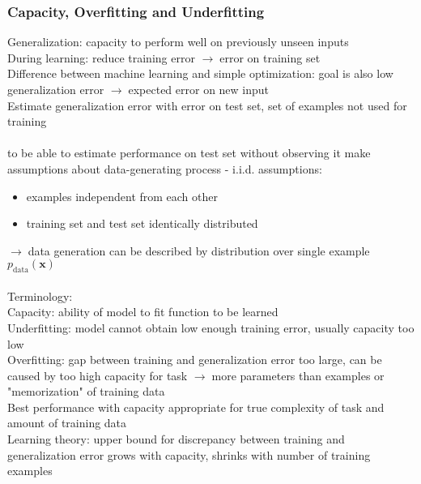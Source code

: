 \documentclass{article}
\newcommand{\arrow}{$\rightarrow\;$}
\renewcommand{\v}{\bm}
\begin{document}
\subsubsection*{Capacity, Overfitting and Underfitting}
Generalization: capacity to perform well on previously unseen inputs \\
During learning: reduce training error \arrow error on training set \\
Difference between machine learning and simple optimization:
goal is also low generalization error \arrow expected error on new input \\
Estimate generalization error with error on test set, set of examples not used for training \\
\\
to be able to estimate performance on test set without observing it make assumptions about data-generating process - i.i.d. assumptions:
\begin{itemize}
    \item examples independent from each other
    \item training set and test set identically distributed
\end{itemize}
\arrow data generation can be described by distribution over single example $p_\text{data}(\v{x})$ \\
\\
Terminology:\\
Capacity: ability of model to fit function to be learned \\
Underfitting: model cannot obtain low enough training error, usually capacity too low \\
Overfitting: gap between training and generalization error too large, can be caused by too high capacity for task
\arrow more parameters than examples or "memorization" of training data \\
Best performance with capacity appropriate for true complexity of task and amount of training data \\
Learning theory: upper bound for discrepancy between training and generalization error grows with capacity, shrinks with number of training examples
\end{document}
